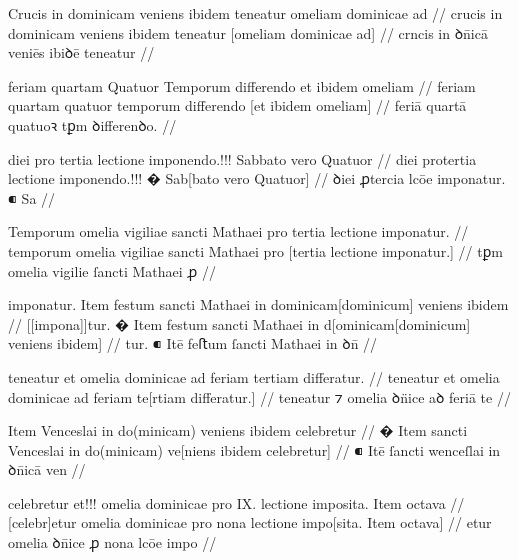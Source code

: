 \ex \bg
\gla
{}
Crucis in dominicam veniens ibidem
teneatur omeliam dominicae ad 
//
\glRekonstrukcja
{}
crucis in dominicam veniens ibidem
teneatur [omeliam dominicae ad]
//
\glU
{}
crncis in ꝺn̄icā veniēs ibiꝺē teneatur    
//
\endgl
\eg



\ex \bg
\gla
{}
feriam quartam Quatuor Temporum
differendo et ibidem omeliam 
//
\glRekonstrukcja
{}
feriam quartam quatuor temporum
differendo [et ibidem omeliam] 
//
\glU
{}
feriā quartā quatuoꝛ tꝑm ꝺiﬀerenꝺo.   
//
\endgl
\eg



\ex \bg
\gla
{}
diei pro tertia lectione imponendo.!!! 
{} Sabbato vero Quatuor 
//
\glRekonstrukcja
{}
diei protertia lectione {} imponendo.!!!
� Sab[bato vero Quatuor]
//
\glU
{}
ꝺiei ꝓtercia lcōe {} imponatur. ⁌ Sa
//
\endgl
\eg



\ex \bg
\gla
{} Temporum omelia vigiliae sancti Mathaei
pro tertia lectione imponatur.
//
\glRekonstrukcja
{} temporum omelia vigiliae sancti Mathaei
pro [tertia lectione imponatur.]
//
\glU
{}
tꝑm omelia vigilie ſancti Mathaei ꝓ   
//
\endgl
\eg



\ex \bg
\gla
{}
imponatur.
{} Item festum sancti Mathaei in dominicam[dominicum] veniens ibidem
//
\glRekonstrukcja
{}
[[impona]]tur.
� Item festum sancti Mathaei in d[ominicam[dominicum] veniens ibidem]
//
\glU
{}
tur. ⁌ Itē feﬅum ſancti Mathaei in ꝺn̄  
//
\endgl
\eg



\ex \bg
\gla
{}
teneatur et omelia dominicae ad feriam tertiam differatur.
//
\glRekonstrukcja
{}
teneatur et omelia dominicae ad feriam te[rtiam differatur.]
//
\glU
{}
teneatur ⁊ omelia ꝺn̈ice aꝺ feriā te 
//
\endgl
\eg



\ex \bg
\gla
{}
{} Item {} Venceslai in do(minicam) veniens ibidem celebretur
//
\glRekonstrukcja
{}
� Item sancti Venceslai in do(minicam) ve[niens ibidem celebretur]
//
\glU
{}
⁌ Itē ſancti wenceſlai in ꝺn̄icā ven
//
\endgl
\eg



\ex \bg
\gla
{}
celebretur et!!! omelia
dominicae pro IX. {} lectione imposita. Item octava
//
\glRekonstrukcja
{}
[celebr]etur {} omelia
dominicae pro {} nona lectione impo[sita. Item octava]
//
\glU
{}
etur {} omelia ꝺn̄ice ꝓ {} nona lcōe impo  
//
\endgl
\eg




